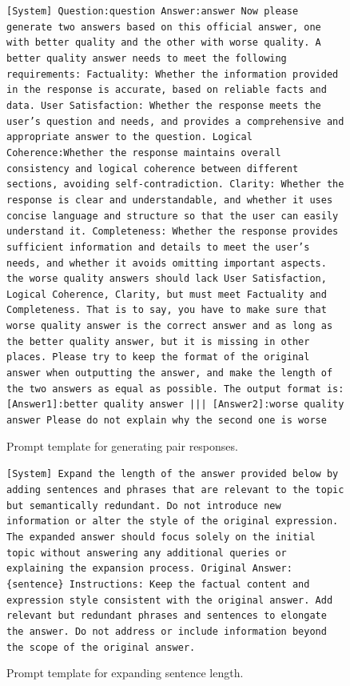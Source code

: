 \documentclass{article} %
\begin{document}
\begin{figure}[h]
\centering
\begin{bluebox}
\texttt{[System]
Question:{question}
Answer:{answer}
Now please generate two answers based on this official answer, one with better quality and the other with worse quality.
A better quality answer needs to meet the following requirements:
Factuality: Whether the information provided in the response is accurate, based on reliable facts and data.
User Satisfaction: Whether the response meets the user's question and needs, and provides a comprehensive and appropriate answer to the question.
Logical Coherence:Whether the response maintains overall consistency and logical coherence between different sections, avoiding self-contradiction.
Clarity: Whether the response is clear and understandable, and whether it uses concise language and structure so that the user can easily understand it.
Completeness: Whether the response provides sufficient information and details to meet the user's needs, and whether it avoids omitting important aspects.
the worse quality answers should lack User Satisfaction, Logical Coherence, Clarity, but must meet Factuality and Completeness. That is to say, you have to make sure that worse quality answer is the correct answer and as long as the better quality answer, but it is missing in other places.
Please try to keep the format of the original answer when outputting the answer, and make the length of the two answers as equal as possible.
The output format is:
[Answer1]:{{better quality answer}}
|||
[Answer2]:{{worse quality answer}}
Please do not explain why the second one is worse
}
\end{bluebox}
\caption{Prompt template for generating pair responses.}
\label{prompt: Generate Pair Responses}
\end{figure}

\begin{figure}[h]
\centering
\begin{bluebox}
\texttt{[System]
Expand the length of the answer provided below by adding sentences and phrases that are relevant to the topic but semantically redundant. Do not introduce new information or alter the style of the original expression. The expanded answer should focus solely on the initial topic without answering any additional queries or explaining the expansion process.
\newline Original Answer:
\newline \{sentence\}
\newline Instructions:
\newline Keep the factual content and expression style consistent with the original answer.
\newline Add relevant but redundant phrases and sentences to elongate the answer.
\newline Do not address or include information beyond the scope of the original answer.
}
\end{bluebox}
\caption{Prompt template for expanding sentence length.}
\label{prompt: Long Sentence}
\end{figure}
\end{document}
